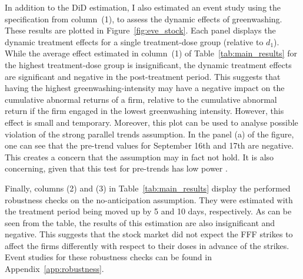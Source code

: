\documentclass[12pt]{article}
\begin{document}
In addition to the DiD estimation, I also estimated an event study using the specification from column~(1), to assess the dynamic effects of greenwashing. These results are plotted in Figure~\ref{fig:eve_stock}. Each panel displays the dynamic treatment effects for a single treatment-dose group (relative to $d_1$). While the average effect estimated in column~(1) of Table~\ref{tab:main_results} for the highest treatment-dose group is insignificant, the dynamic treatment effects are significant and negative in the post-treatment period. This suggests that having the highest greenwashing-intensity may have a negative impact on the cumulative abnormal returns of a firm, relative to the cumulative abnormal return if the firm engaged in the lowest greenwashing intensity. However, this effect is small and temporary. Moreover, this plot can be used to analyse possible violation of the strong parallel trends assumption. In the panel (a) of the figure, one can see that the pre-trend values for September 16th and 17th are negative. This creates a concern that the assumption may in fact not hold. It is also concerning, given that this test for pre-trends has low power \parencite{rothWhatsTrendingDifferenceindifferences2023}.
                            

Finally, columns (2) and (3) in Table~\ref{tab:main_results} display the performed robustness checks on the no-anticipation assumption. They were estimated with the treatment period being moved up by 5 and 10 days, respectively. As can be seen from the table, the results of this estimation are also insignificant and negative. This suggests that the stock market did not expect the FFF strikes to affect the firms differently with respect to their doses in advance of the strikes. Event studies for these robustness checks can be found in Appendix~\ref{app:robustness}.
\end{document}
